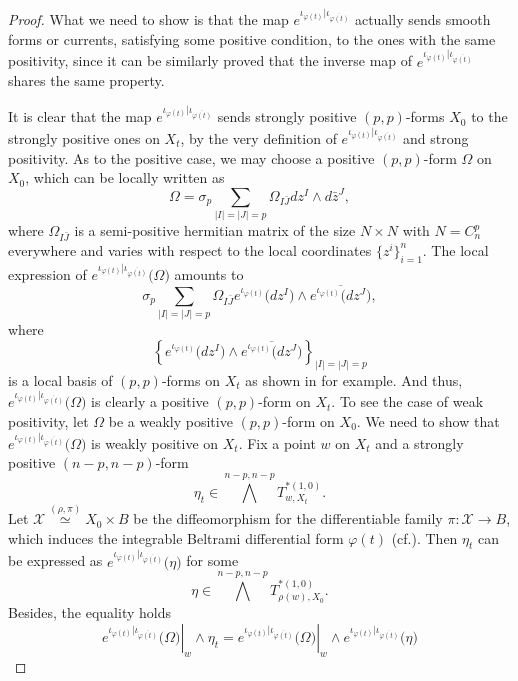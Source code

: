 \documentclass[12pt]{amsart}
\numberwithin{equation}{section}
\renewcommand{\1}{\mathds{1}}
\renewcommand{\>}{\rightarrow}
\def\b{\bar}
\begin{document}
\begin{proof}
What we need to show is that the map $e^{\iota_{\varphi(t)}|\iota_{\overline{\varphi(t)}}}$ actually sends smooth forms or currents, satisfying
some positive condition, to the ones with the same positivity, since it can be similarly proved that
the inverse map of $e^{\iota_{\varphi(t)}|\iota_{\overline{\varphi(t)}}}$ shares the same property.

It is clear that the map $e^{\iota_{\varphi(t)}|\iota_{\overline{\varphi(t)}}}$ sends strongly positive $(p,p)$-forms $X_0$ to the strongly positive ones
on $X_t$, by the very definition of $e^{\iota_{\varphi(t)}|\iota_{\overline{\varphi(t)}}}$ and strong positivity. As to the positive case,
we may choose a positive $(p,p)$-form $\Omega$ on $X_0$, which can be locally written as
\[ \Omega = \sigma_p \sum_{|I|=|J|=p} \Omega_{I\b{J}} dz^{I} \wedge d\b{z}^{J},\]
where $\Omega_{I\b{J}}$ is a semi-positive hermitian matrix of the size $N \times N$ with $N=C_{n}^p$ everywhere and varies with respect to the local
coordinates $\{z^i\}_{i=1}^n$. The local expression of $e^{\iota_{\varphi(t)}|\iota_{\overline{\varphi(t)}}}\big(\Omega\big)$ amounts to
\[ \sigma_p \sum_{|I|=|J|=p} \Omega_{I\b{J}} e^{\iota_{\varphi(t)}}\big(dz^{I}\big)
\wedge \overline{e^{\iota_{\varphi(t)}} \big(dz^{J}\big)}, \]
where $$\left\{ e^{\iota_{\varphi(t)}}\big(dz^{I}\big)
\wedge \overline{e^{\iota_{\varphi(t)}} \big(dz^{J}\big)} \right\}_{|I|=|J|=p}$$ is a local basis
of $(p,p)$-forms on $X_t$ as shown in \cite[Lemma 2.4]{RZ15} for example. And thus, $e^{\iota_{\varphi(t)}|\iota_{\overline{\varphi(t)}}}\big(\Omega\big)$ is clearly a positive $(p,p)$-form on $X_t$.
To see the case of weak positivity, let $\Omega$ be a weakly positive $(p,p)$-form on $X_0$. We need to show that
$e^{\iota_{\varphi(t)}|\iota_{\overline{\varphi(t)}}} \big( \Omega \big)$ is weakly positive on $X_t$. Fix a point $w$ on $X_t$
and a strongly positive $(n-p,n-p)$-form \[\eta_t \in \bigwedge^{n-p,n-p}T^{*(1,0)}_{w, X_t}.\]
Let $\mathcal{X} \stackrel{(\rho,\pi)}{\simeq} X_0 \times B$ be the diffeomorphism for the  differentiable family $\pi:\mathcal{X}\> B$, which
induces the integrable Beltrami differential form $\varphi(t)$ (cf.\cite{C}). Then $\eta_t$ can be expressed as $e^{\iota_{\varphi(t)}|\iota_{\overline{\varphi(t)}}}\big(\eta\big)$
for some
\[ \eta \in \bigwedge^{n-p,n-p} T^{*(1,0)}_{\rho(w), X_0}. \]
Besides, the equality holds
\[ \left.e^{\iota_{\varphi(t)}|\iota_{\overline{\varphi(t)}}} \big( \Omega \big)\right|_{w} \wedge \eta_t
= \left.e^{\iota_{\varphi(t)}|\iota_{\overline{\varphi(t)}}} \big( \Omega \big)\right|_{w} \wedge e^{\iota_{\varphi(t)}|\iota_{\overline{\varphi(t)}}} \big( \eta \big)
\]
\end{proof}
\end{document}
